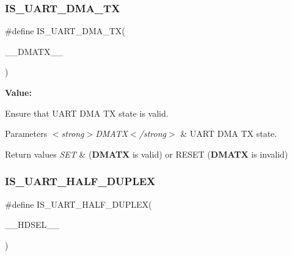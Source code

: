 \subsubsection{\texorpdfstring{IS\_UART\_DMA\_TX}{IS\_UART\_DMA\_TX}}
{\footnotesize\ttfamily \#define I\+S\+\_\+\+U\+A\+R\+T\+\_\+\+D\+M\+A\+\_\+\+TX(\begin{DoxyParamCaption}\item[{}]{\+\_\+\+\_\+\+D\+M\+A\+T\+X\+\_\+\+\_\+ }\end{DoxyParamCaption})}

{\bfseries Value\+:}
\begin{DoxyCode}{0}

\end{DoxyCode}


Ensure that U\+A\+RT D\+MA TX state is valid. 


\begin{DoxyParams}{Parameters}
{\em $<$strong$>$\+D\+M\+A\+T\+X$<$/strong$>$} & U\+A\+RT D\+MA TX state. \\
\hline
\end{DoxyParams}

\begin{DoxyRetVals}{Return values}
{\em S\+ET} & ({\bfseries{D\+M\+A\+TX}} is valid) or R\+E\+S\+ET ({\bfseries{D\+M\+A\+TX}} is invalid) \\
\hline
\end{DoxyRetVals}
\mbox{\label{group___u_a_r_t___private___macros_ga2298a324be00d275d98b336569ee3f97}} 
\subsubsection{\texorpdfstring{IS\_UART\_HALF\_DUPLEX}{IS\_UART\_HALF\_DUPLEX}}
{\footnotesize\ttfamily \#define I\+S\+\_\+\+U\+A\+R\+T\+\_\+\+H\+A\+L\+F\+\_\+\+D\+U\+P\+L\+EX(\begin{DoxyParamCaption}\item[{}]{\+\_\+\+\_\+\+H\+D\+S\+E\+L\+\_\+\+\_\+ }\end{DoxyParamCaption})}

